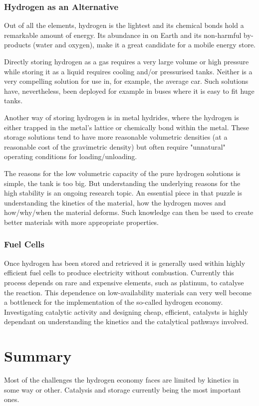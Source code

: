 \subsubsection{Hydrogen as an Alternative}
Out of all the elements, hydrogen is the lightest and its chemical bonds hold a remarkable amount of energy.
Its abundance in on Earth and its non-harmful by-products (water and oxygen), make it a great candidate for a mobile energy store.

Directly storing hydrogen as a gas requires a very large volume or high pressure while storing it as a liquid requires cooling and/or pressurised tanks.
Neither is a very compelling solution for use in, for example, the average car.
Such solutions have, nevertheless, been deployed for example in buses where it is easy to fit huge tanks. %

Another way of storing hydrogen is in metal hydrides, where the hydrogen is either trapped in the metal's lattice or chemically bond within the metal.
These storage solutions tend to have more reasonable volumetric densities (at a reasonable cost of the gravimetric density) but often require "unnatural" operating conditions for loading/unloading.~\cite{borohydride-stability-2006}

The reasons for the low volumetric capacity of the pure hydrogen solutions is simple, the tank is too big.
But understanding the underlying reasons for the high stability is an ongoing research topic.
An essential piece in that puzzle is understanding the kinetics of the material, how the hydrogen moves and how/why/when the material deforms.
Such knowledge can then be used to create better materials with more appropriate properties.

\subsubsection{Fuel Cells}
Once hydrogen has been stored and retrieved it is generally used within highly efficient fuel cells to produce electricity without combustion. %
Currently this process depends on rare and expensive elements, such as platinum, to catalyse the reaction.
This dependence on low-availability materials can very well become a bottleneck for the implementation of the so-called hydrogen economy.
Investigating catalytic activity and designing cheap, efficient, catalysts is highly dependant on understanding the kinetics and the catalytical pathways involved.

\section{Summary}
Most of the challenges the hydrogen economy faces are limited by kinetics in some way or other.
Catalysis and storage currently being the most important ones.

